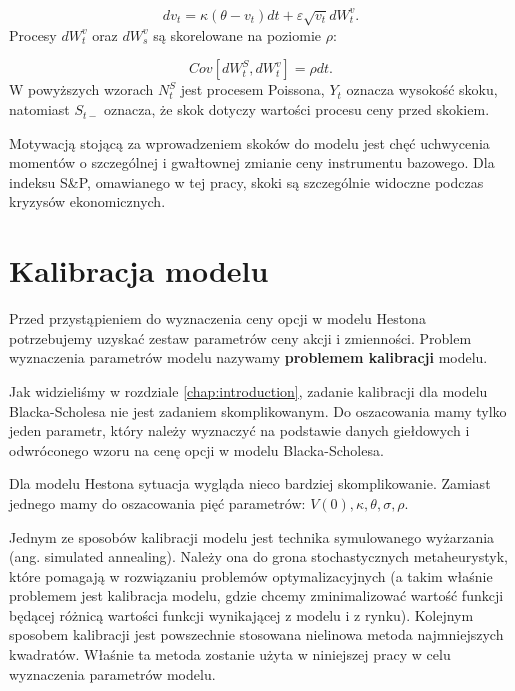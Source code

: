 \documentclass{pracamgr}
\begin{document}
\begin{equation}
dv_t  = \kappa (\theta - v_t)dt + \varepsilon \sqrt{v_t} dW_t^v.
\end{equation}
Procesy $dW_t^v$ oraz $dW_s^v$ są skorelowane na poziomie $\rho$:

\begin{equation}
Cov[dW^S_t, dW^v_t] = \rho dt.
\end{equation}
W powyższych wzorach $N_t^S$ jest procesem Poissona, $Y_t$ oznacza wysokość skoku, 
natomiast $S_{t-}$ oznacza, że skok dotyczy wartości procesu ceny przed skokiem.

Motywacją stojącą za wprowadzeniem skoków do modelu jest chęć uchwycenia momentów o 
szczególnej i gwałtownej zmianie ceny instrumentu bazowego. Dla indeksu S\&P, omawianego w tej pracy,
skoki są szczególnie widoczne podczas kryzysów ekonomicznych. 



 


\chapter{Kalibracja modelu}
\label{chap:chapterModelCalibration}



Przed przystąpieniem do wyznaczenia ceny opcji w modelu Hestona potrzebujemy uzyskać zestaw 
parametrów ceny akcji i zmienności. Problem wyznaczenia parametrów modelu 
nazywamy \textbf{problemem kalibracji} modelu.  

Jak widzieliśmy w rozdziale \ref{chap:introduction}, zadanie kalibracji dla modelu Blacka-Scholesa 
nie jest zadaniem skomplikowanym. Do oszacowania mamy tylko jeden parametr, który należy wyznaczyć na 
podstawie danych giełdowych i odwróconego wzoru na cenę opcji w modelu Blacka-Scholesa.

Dla modelu Hestona sytuacja wygląda nieco bardziej skomplikowanie. Zamiast jednego mamy do 
oszacowania pięć parametrów:
$V(0),\kappa, \theta, \sigma, \rho$.  

Jednym ze sposobów kalibracji modelu jest technika symulowanego 
wyżarzania (ang. simulated annealing). Należy ona do 
grona stochastycznych metaheurystyk,  które pomagają w rozwiązaniu problemów 
optymalizacyjnych (a takim właśnie problemem 
jest kalibracja modelu, gdzie chcemy zminimalizować wartość funkcji będącej różnicą wartości funkcji 
wynikającej z modelu i z rynku). Kolejnym sposobem kalibracji jest powszechnie stosowana nielinowa
metoda najmniejszych kwadratów. 
Właśnie ta metoda zostanie użyta w niniejszej pracy w celu wyznaczenia parametrów modelu.
\end{document}
